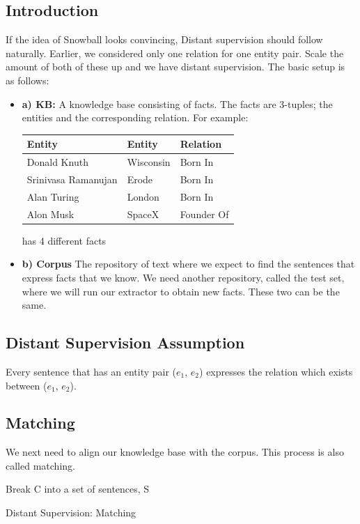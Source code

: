 \documentclass[a4paper,10pt]{article}
\begin{document}
\subsection{Introduction}
If the idea of Snowball looks convincing, Distant supervision should follow naturally.
Earlier, we considered only one relation for one entity pair. Scale the amount of both of these up
and we have distant supervision.
The basic setup is as follows:
\begin{itemize}

\item \textbf{a) KB:} A knowledge base consisting of facts. The facts are 3-tuples; the entities and the corresponding relation.
For example:
\begin{center}

\begin{tabular}{|l|l|l|}
\hline
Entity & Entity & Relation \\
\hline
Donald Knuth & Wisconsin & Born In\\
Srinivasa Ramanujan & Erode & Born In \\
Alan Turing & London & Born In \\
Alon Musk & SpaceX & Founder Of\\
\hline
\end{tabular}
\end{center}

has 4 different facts

\item \textbf{b) Corpus}
The repository of text where we expect to find the sentences that express facts that we know.
We need another repository, called the test set, where we will run our extractor to obtain new facts.
These two can be the same.
\end{itemize}

\subsection{Distant Supervision Assumption}
Every sentence that has an entity pair ($e_1$, $e_2$) expresses the relation which exists between ($e_1$, $e_2$).
\subsection{Matching}
We next need to align our knowledge base with the corpus. This process is also called matching.

\begin{algorithm}[H]
 Break C into a set of sentences, S\;
 \caption{Distant Supervision: Matching}
\end{algorithm}
\end{document}
